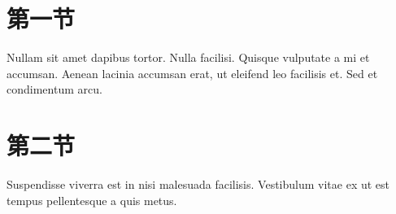 \documentclass[float=false, crop=false]{standalone}
\begin{document}
\section{第一节}
Nullam sit amet dapibus tortor.
    Nulla facilisi. Quisque vulputate a mi et accumsan.
    Aenean lacinia accumsan erat, ut eleifend leo facilisis et.
    Sed et condimentum arcu.
\section{第二节}
Suspendisse viverra est in nisi malesuada facilisis.
    Vestibulum vitae ex ut est tempus pellentesque a quis metus.
    
\end{document}
